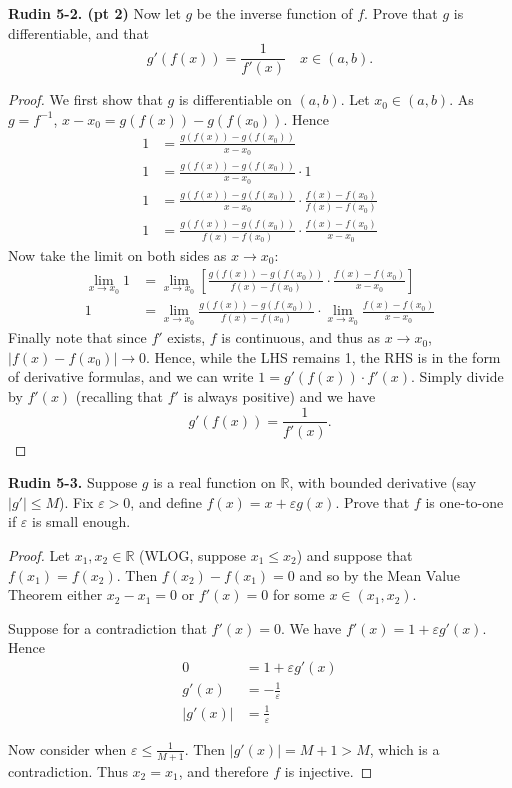 \documentclass{article}
\newcommand{\R}{\mathbb{R}}
\newcommand{\abs}[1]{\left| #1 \right|}
\newcommand{\brac}[1]{\left[ #1 \right]}
\newcommand{\problem}[1]{\noindent \textbf{#1}}
\begin{document}
\problem{Rudin 5-2. (pt 2)}
Now let $g$ be the inverse function of $f$. Prove that $g$ is differentiable, and that
$$g'(f(x)) = \frac{1}{f'(x)} \quad x \in (a, b).$$
\begin{proof}
    We first show that $g$ is differentiable on $(a, b)$. Let $x_0 \in (a, b)$. As $g = f^{-1}$, $x - x_0 = g(f(x)) - g(f(x_0))$. Hence
    \begin{align*}
        1 &= \frac{g(f(x)) - g(f(x_0))}{x - x_0} \\
        1 &= \frac{g(f(x)) - g(f(x_0))}{x - x_0} \cdot 1 \\
        1 &= \frac{g(f(x)) - g(f(x_0))}{x - x_0} \cdot \frac{f(x) - f(x_0)}{f(x) - f(x_0)} \\
        1 &= \frac{g(f(x)) - g(f(x_0))}{f(x) - f(x_0)} \cdot \frac{f(x) - f(x_0)}{x - x_0}
    \end{align*}
    Now take the limit on both sides as $x \to x_0$:
    \begin{align*}
        \lim_{x \to x_0} 1 &= \lim_{x \to x_0} \brac{\frac{g(f(x)) - g(f(x_0))}{f(x) - f(x_0)} \cdot \frac{f(x) - f(x_0)}{x - x_0}} \\
        1 &= \lim_{x \to x_0} \frac{g(f(x)) - g(f(x_0))}{f(x) - f(x_0)} \cdot \lim_{x \to x_0} \frac{f(x) - f(x_0)}{x - x_0}        
    \end{align*}
    Finally note that since $f'$ exists, $f$ is continuous, and thus as $x \to x_0$, $\abs{f(x) - f(x_0)} \to 0$. Hence, while the LHS remains 1, the RHS is in the form of derivative formulas, and we can write
    $1 = g'(f(x)) \cdot f'(x)$.
    Simply divide by $f'(x)$ (recalling that $f'$ is always positive) and we have
    $$g'(f(x)) = \frac{1}{f'(x)}.$$    
\end{proof}


\problem{Rudin 5-3. } %
Suppose $g$ is a real function on $\R$, with bounded derivative (say $\abs{g'} \le M$). Fix $\varepsilon > 0$, and define $f(x) = x + \varepsilon g(x)$. Prove that $f$ is one-to-one if $\varepsilon$ is small enough.

\begin{proof}
    Let $x_1, x_2 \in \R$ (WLOG, suppose $x_1 \le x_2$) and suppose that $f(x_1) = f(x_2)$. Then $f(x_2) - f(x_1) = 0$ and so by the Mean Value Theorem either $x_2 - x_1 = 0$ or $f'(x) = 0$ for some $x \in (x_1, x_2)$.  
    
    Suppose for a contradiction that $f'(x) = 0$. We have $f'(x) = 1 + \varepsilon g'(x)$. Hence 
    \begin{align*}
        0 &= 1 + \varepsilon g'(x) \\
        g'(x) &= -\frac{1}{\varepsilon} \\
        \abs{g'(x)} &= \frac{1}{\varepsilon}       
    \end{align*}

    Now consider when $\displaystyle \varepsilon \le \frac{1}{M + 1}$. Then $\abs{g'(x)} = M + 1 > M$, which is a contradiction. Thus $x_2 = x_1$, and therefore $f$ is injective.
\end{proof}
\end{document}
